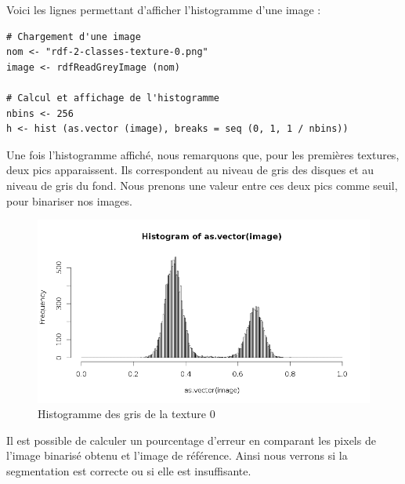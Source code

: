 \documentclass[11pt]{article}
\begin{document}
  \newpage
  
  Voici les lignes permettant d'afficher l'histogramme d'une image :
  
  \begin{lstlisting}[caption=Afficher l'histogramme d'une image]
# Chargement d'une image
nom <- "rdf-2-classes-texture-0.png"
image <- rdfReadGreyImage (nom)

# Calcul et affichage de l'histogramme
nbins <- 256
h <- hist (as.vector (image), breaks = seq (0, 1, 1 / nbins))\end{lstlisting}

  Une fois l'histogramme affiché, nous remarquons que, pour les premières textures, deux pics apparaissent. 
  Ils correspondent au niveau de gris des disques et au niveau de gris du fond. Nous prenons une valeur 
  entre ces deux pics comme seuil, pour binariser nos images.
  
  \begin{figure}[H]
    \center
    \includegraphics[width=14cm]{../elliot/gris0.png}
    \caption{Histogramme des gris de la texture 0}
  \end{figure}

  Il est possible de calculer un pourcentage d'erreur en comparant les pixels de l'image
  binarisé obtenu et l'image de référence. Ainsi nous verrons si la segmentation est correcte
  ou si elle est insuffisante.
  
\end{document}
